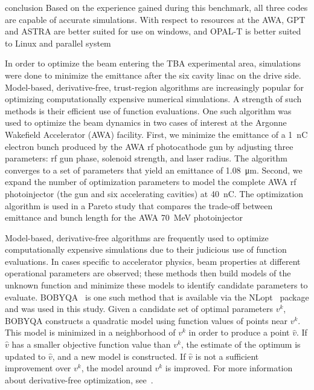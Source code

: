 \documentclass{iitthesis}
\newcommand{\nrnote}[1]{\textsf{{\color{blue}{ NN note:}   #1 }}}
\begin{document}
\nrnote{conclusion}
Based on the experience gained during this benchmark, 
all  three  codes  are  capable  of  accurate  simulations.  With  
respect  to  resources  at  the  AWA,  GPT  and  ASTRA  are  
better  suited  for  use  on  windows,  and  OPAL-T  is  better  
suited to Linux and parallel system

 \label{sec:opt}
In order to optimize the beam entering the TBA experimental area, 
simulations were done to minimize the emittance after the six cavity linac
on the drive side. 
Model-based, derivative-free, trust-region algorithms 
are increasingly popular for optimizing computationally 
expensive numerical simulations. A strength of such
methods is their efficient use of function evaluations. 
One such algorithm was used to optimize 
the beam dynamics in two cases of interest at the 
Argonne Wakefield Accelerator (AWA) facility. 
First, we minimize the emittance of a \SI{1}{nC} electron 
bunch produced by the AWA rf photocathode gun 
by adjusting three parameters: rf gun phase, 
solenoid strength, and laser radius. The algorithm 
converges to a set of parameters that yield an
emittance of \SI{1.08}{\um}. Second, we expand 
the number of optimization parameters to model the complete AWA rf 
photoinjector (the gun and six accelerating cavities) at \SI{40}{nC}. 
The optimization algorithm is used in a Pareto study that compares the 
trade-off between emittance and bunch 
length for the AWA \SI{70}{MeV} photoinjector


Model-based, derivative-free algorithms are frequently used to optimize
computationally expensive simulations due to their judicious use of function
evaluations. In cases specific to accelerator physics, 
beam properties at different operational parameters are observed;
these methods then build models of the unknown
function and minimize these models to identify candidate parameters to 
evaluate. BOBYQA~\cite{bobyqa} is one such method that is available via the
NLopt~\cite{nlopt} package and was used in this study. 
Given a candidate set of optimal parameters $v^k$, BOBYQA
constructs a quadratic model using function values of points near $v^k$. This
model is minimized in a neighborhood of $v^k$ in order to produce a point $\hat{v}$. If $\hat{v}$ 
has a smaller objective function value than $v^k$, the estimate of the optimum is
updated to $\hat{v}$, and a new model is constructed. If $\hat{v}$ is not a
sufficient improvement over $v^k$, the model around $v^k$ is improved. For more
information about derivative-free optimization, see~\cite{Conn2009a}.
\end{document}
